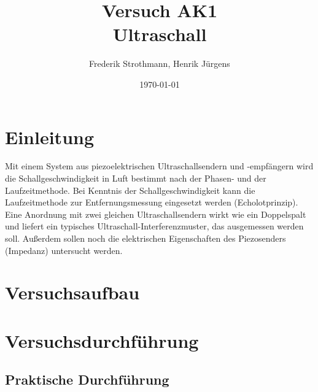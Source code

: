 \documentclass[12pt]{scrartcl}
\title{Versuch AK1\\ Ultraschall}
\author{Frederik Strothmann, Henrik Jürgens}
\date{\today}
\begin{document}

\maketitle
\tableofcontents
\newpage


\section{Einleitung}
Mit einem System aus piezoelektrischen Ultraschallsendern und -empfängern wird die Schallgeschwindigkeit in Luft
bestimmt nach der Phasen- und der Laufzeitmethode. Bei Kenntnis der Schallgeschwindigkeit kann die Laufzeitmethode zur Entfernungsmessung eingesetzt werden (Echolotprinzip). Eine Anordnung mit zwei gleichen Ultraschallsendern wirkt wie ein Doppelspalt und liefert ein typisches
Ultraschall-Interferenzmuster, das ausgemessen werden soll.
Außerdem sollen noch die elektrischen Eigenschaften des Piezosenders (Impedanz) untersucht werden.


\section{Versuchsaufbau}


\section{Versuchsdurchführung}


\subsection{Praktische Durchführung}
\end{document}
